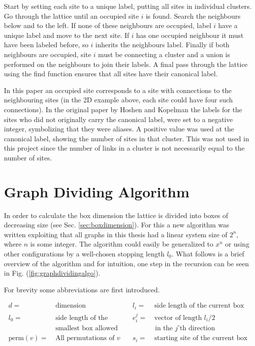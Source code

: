 Start by setting each site to a unique label, putting all sites in individual clusters. Go through the lattice until an occupied site $i$ is found. Search the neighbours below and to the left. If none of these neighbours are occupied, label $i$ have a unique label and move to the next site. If $i$ has one occupied neighbour it must have been labeled before, so $i$ inherits the neighbours label. Finally if both neighbours are occupied, site $i$ must be connecting a cluster and a union is performed on the neighbours to join their labels. A final pass through the lattice using the find function ensures that all sites have their canonical label.

In this paper an occupied site corresponds to a site with connections to the neighbouring sites (in the 2D example above, each site could have four such connections). In the original paper by Hoshen and Kopelman \cite{Hoshen:HKAlgo} the labels for the sites who did not originally carry the canonical label, were set to a negative integer, symbolizing that they were aliases. A positive value was used at the canonical label, showing the number of sites in that cluster. This was not used in this project since the number of links in a cluster is not necessarily equal to the number of sites.

\section{Graph Dividing Algorithm}
\label{sec:GraphDivisonAlgorithm}


In order to calculate the box dimension the lattice is divided into boxes of decreasing size (see Sec. \ref{sec:boxdimension}). For this a new algorithm was written exploiting that all graphs in this thesis had a linear system size of $2^{n}$, where $n$ is some integer. The algorithm could easily be generalized to $x^n$ or using other configurations by a well-chosen stopping length $l_0$. What follows is a brief overview of the algorithm and for intuition, one step in the recursion can be seen in Fig. (\ref{fig:graphdividingalgo}).

For brevity some abbreviations are first introduced.

\begin{equation*}
    \begin{aligned}
        d =& \ \text{dimension} &\quad l_i =& \ \text{side length of the current box}\\
%
        l_0 =& \ \text{side length of the} &\quad e_i^j =& \ \text{vector of length } l_i / 2 \\
%
             & \ \text{smallest box allowed} & & \text{ in the }j\text{'th direction} \\
%
        \text{perm}(v) =& \ \text{All permutations of } v &\quad s_i =& \ \text{starting site of the current box}
    \end{aligned}
\end{equation*}

